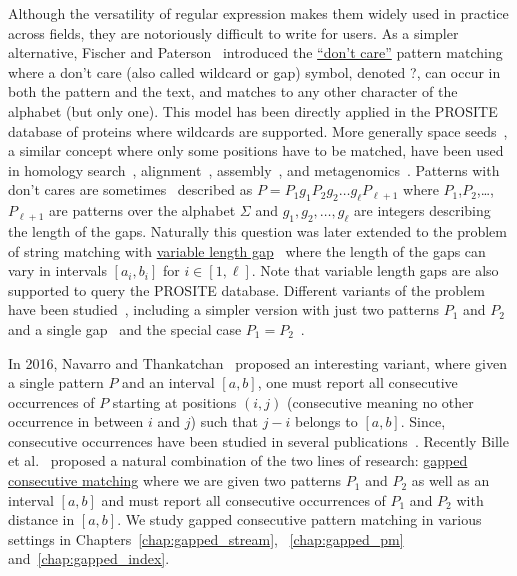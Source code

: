 Although the versatility of regular expression makes them widely used in practice across fields, they are notoriously difficult to write for users.
As a simpler alternative, Fischer and Paterson~\cite{fischer1974string} introduced the \underline{``don't care''} pattern matching where a don't care (also called wildcard or gap) symbol, denoted ?, can occur in both the pattern and the text, and matches to any other character of the alphabet (but only one).
This model has been directly applied in the PROSITE~\cite{hulo2006prosite} database of proteins where wildcards are supported. More generally space seeds~\cite{li2004patternhunter}, a similar concept where only some positions have to be matched, have been used in homology search~\cite{ma2002patternhunter}, alignment~\cite{david2011shrimp2}, assembly~\cite{birol2015spaced}, and metagenomics~\cite{bvrinda2015spaced}.
Patterns with don't cares are sometimes~\cite{lewenstein2011indexing} described as $P= P_1g_1P_2g_2 \dots g_\ell P_{\ell+1}$ where $P_1$,$P_2$,\dots,$P_{\ell+1}$ are patterns over the alphabet $\Sigma$ and $g_1,g_2,\dots,g_{\ell}$ are integers describing the length of the gaps. 
Naturally this question was later extended to the problem of string matching with \underline{variable length gap}~\cite{bille2012string,bille2014string} where the length of the gaps can vary in intervals $[a_i,b_i]$ for $i\in[1,\ell]$.
Note that variable length gaps are also supported to query the PROSITE database.
Different variants of the problem have been studied~\cite{kopelowitz2016color,cohen2009range,brodal1999finding}, including a simpler version with just two patterns $P_1$ and $P_2$ and a single gap~\cite{peterlongo2006gapped,iliopoulos2009indexing} and the special case $P_1=P_2$~\cite{muthukrishnan2002efficient,keller2007range}.

In 2016, Navarro and Thankatchan~\cite{NAVARRO2016108} proposed an interesting variant, where given a single pattern $P$ and an interval $[a,b]$, one must report all consecutive occurrences of $P$ starting at positions $(i,j)$ (consecutive meaning no other occurrence in between $i$ and $j$) such that $j-i$ belongs to $[a,b]$. Since, consecutive occurrences have been studied in several publications~\cite{DBLP:conf/fsttcs/BilleGPRS20,cpm/BilleGPS21,DBLP:journals/corr/abs-2304-00887,DBLP:journals/corr/abs-2211-16860}.
Recently Bille et al.~\cite{bille2022gapped} proposed a natural combination of the two lines of research: \underline{gapped consecutive matching} where we are given two patterns $P_1$ and $P_2$ as well as an interval $[a,b]$ and must report all consecutive occurrences of $P_1$ and $P_2$ with distance in $[a,b]$.
We study gapped consecutive pattern matching in various settings in Chapters~\ref{chap:gapped_stream}, ~\ref{chap:gapped_pm} and~\ref{chap:gapped_index}.


